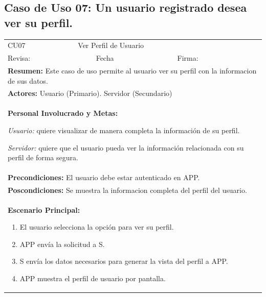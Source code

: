 		\subsection{Caso de Uso 07: Un usuario registrado desea ver su perfil.}
			\begin{longtable}{|l|p{5.5cm}|l|p{2cm}|l|p{1.9cm}|} \hline
				\cellcolor{grisOscuro} CU07 & \multicolumn{4}{|l|}{  \cellcolor{grisOscuro} Ver Perfil de Usuario} &  \cellcolor{grisClaro}\multirow{2}{1cm}{} \\ \cline{1-5}
				\cellcolor{grisOscuro} Revisa: &  \cellcolor{grisClaro} &  \cellcolor{grisOscuro} Fecha &  \cellcolor{grisClaro} &  \cellcolor{grisOscuro} Firma: & \cellcolor{grisClaro} \\ \hline
				\multicolumn{6}{|p{15cm}|}{ \textbf{Resumen: } Este caso de uso permite al usuario ver su perfil con la informacion de sus datos.

				} \\ \hline

				\multicolumn{6}{|p{15cm}|}{ \textbf{Actores: } Usuario (Primario). Servidor (Secundario)

				} \\ \hline

				\multicolumn{6}{|p{15cm}|}{ \textbf{Personal Involucrado y Metas: }
				
				\emph{Usuario:} quiere visualizar de manera completa la información de su perfil.

				\emph{Servidor:} quiere que el usuario pueda ver la información relacionada con su perfil de forma segura.

				} \\ \hline

				\multicolumn{6}{|p{15cm}|}{ \textbf{Precondiciones: } El usuario debe estar autenticado en APP.

				} \\ \hline

				\multicolumn{6}{|p{15cm}|}{ \textbf{Poscondiciones: } Se muestra la informacion completa del perfil del usuario.

				} \\ \hline

				\multicolumn{6}{|p{15cm}|}{ \textbf{Escenario Principal: }

				\begin{enumerate}
					\item El usuario selecciona la opción para ver su perfil.
					\item APP envía la solicitud a S.
					\item S envía los datos necesarios para generar la vista del perfil a APP.
					\item APP muestra el perfil de usuario por pantalla.
				\end{enumerate}

}
\end{longtable}
